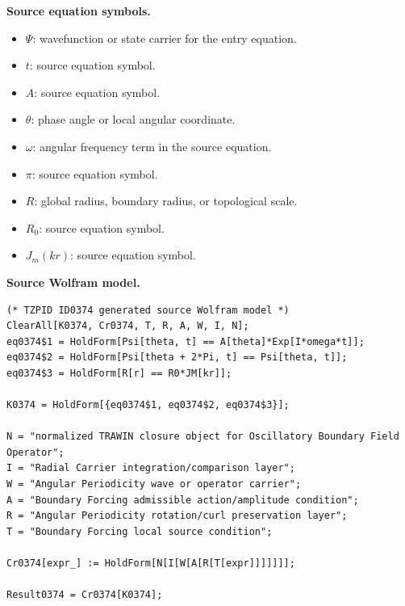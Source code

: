 \begin{minipage}[t]{0.49\linewidth}
\begingroup
\small
\raggedright
\textbf{Source equation symbols.}\par
\begin{itemize}[leftmargin=1.35em,itemsep=1pt,topsep=1pt,parsep=0pt]
    \item $\Psi$: wavefunction or state carrier for the entry equation.
    \item $t$: source equation symbol.
    \item $A$: source equation symbol.
    \item $\theta$: phase angle or local angular coordinate.
    \item $\omega$: angular frequency term in the source equation.
    \item $\pi$: source equation symbol.
    \item $R$: global radius, boundary radius, or topological scale.
    \item $R_{0}$: source equation symbol.
    \item $J_{m}(kr)$: source equation symbol.
\end{itemize}
\endgroup
\end{minipage}\hfill
\begin{minipage}[t]{0.47\linewidth}
\begingroup
\scriptsize
\raggedright
\textbf{Source Wolfram model.}\par
\begin{Verbatim}[fontsize=\tiny,breaklines=true,breakanywhere=true]
(* TZPID ID0374 generated source Wolfram model *)
ClearAll[K0374, Cr0374, T, R, A, W, I, N];
eq0374$1 = HoldForm[Psi[theta, t] == A[theta]*Exp[I*omega*t]];
eq0374$2 = HoldForm[Psi[theta + 2*Pi, t] == Psi[theta, t]];
eq0374$3 = HoldForm[R[r] == R0*JM[kr]];

K0374 = HoldForm[{eq0374$1, eq0374$2, eq0374$3}];

N = "normalized TRAWIN closure object for Oscillatory Boundary Field Operator";
I = "Radial Carrier integration/comparison layer";
W = "Angular Periodicity wave or operator carrier";
A = "Boundary Forcing admissible action/amplitude condition";
R = "Angular Periodicity rotation/curl preservation layer";
T = "Boundary Forcing local source condition";

Cr0374[expr_] := HoldForm[N[I[W[A[R[T[expr]]]]]]];

Result0374 = Cr0374[K0374];
\end{Verbatim}
\endgroup
\end{minipage}

